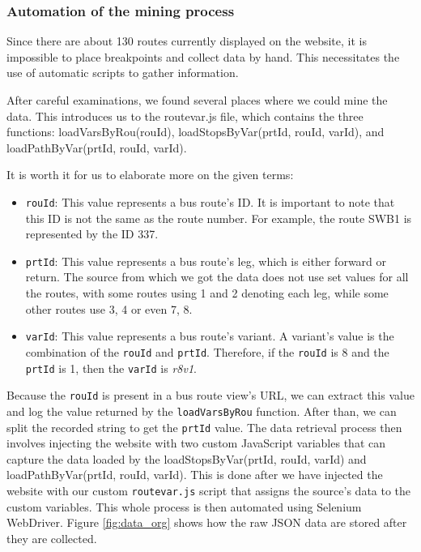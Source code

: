\subsubsection{Automation of the mining process}

Since there are about 130 routes currently displayed on the website, it is impossible to place breakpoints and collect data by hand. This necessitates the use of automatic scripts to gather information.

After careful examinations, we found several places where we could mine the data. This introduces us to the routevar.js file, which contains the three functions: loadVarsByRou(rouId), loadStopsByVar(prtId, rouId, varId), and loadPathByVar(prtId, rouId, varId).

It is worth it for us to elaborate more on the given terms:
\begin{itemize}
    \item \lstinline{rouId}: This value represents a bus route's ID. It is important to note that this ID is not the same as the route number. For example, the route SWB1 is represented by the ID 337. 
    \item \lstinline{prtId}: This value represents a bus route's leg, which is either forward or return. The source from which we got the data does not use set values for all the routes, with some routes using 1 and 2 denoting each leg, while some other routes use 3, 4 or even 7, 8. 
    \item \lstinline{varId}: This value represents a bus route's variant. A variant's value is the combination of the \lstinline{rouId} and \lstinline{prtId}. Therefore, if the \lstinline{rouId} is 8 and the \lstinline{prtId} is 1, then the \lstinline{varId} is \textit{r8v1}.
\end{itemize}

Because the \lstinline{rouId} is present in a bus route view's URL, we can extract this value and log the value returned by the \lstinline{loadVarsByRou} function. After than, we can split the recorded string to get the \lstinline{prtId} value. The data retrieval process then involves injecting the website with two custom JavaScript variables that can capture the data loaded by the loadStopsByVar(prtId, rouId, varId) and loadPathByVar(prtId, rouId, varId). This is done after we have injected the website with our custom \lstinline{routevar.js} script that assigns the source's data to the custom variables. This whole process is then automated using Selenium WebDriver. Figure \ref{fig:data_org} shows how the raw JSON data are stored after they are collected.

